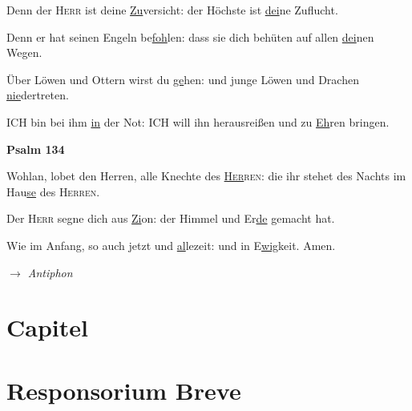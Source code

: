 \begin{multicols}{2}
 Denn der \textsc{Herr} ist deine \underline{Zu}versicht: \grestar{} der Höchste ist \underline{dei}ne Zuflucht.\par
 Denn er hat seinen Engeln be\underline{foh}len: \grestar{} dass sie dich behüten auf allen \underline{dei}nen Wegen.\par
 Über Löwen und Ottern wirst du \underline{ge}hen: \grestar{} und junge Löwen und Drachen \underline{nie}dertreten.\par
 ICH bin bei ihm \underline{in} der Not: \grestar{} ICH will ihn herausreißen und zu \underline{Eh}ren bringen.\par
 \textbf{Psalm 134}\par
 Wohlan, lobet den Herren, alle Knechte des \textsc{\underline{Her}ren:}
\grestar{} die ihr stehet des Nachts im Hau\underline{se} des
\textsc{Herren.}\par
 Der \textsc{Herr} segne dich aus \underline{Zi}on: \grestar{} der Himmel und Er\underline{de} gemacht hat.\par
  Wie im Anfang, so auch jetzt und \underline{al}lezeit: \grestar{} und in E\underline{wig}keit. Amen.\par
 \textit{$\rightarrow$ Antiphon}
\end{multicols}
 \newpage
\section*{Capitel}
\section*{Responsorium Breve}
\newpage
